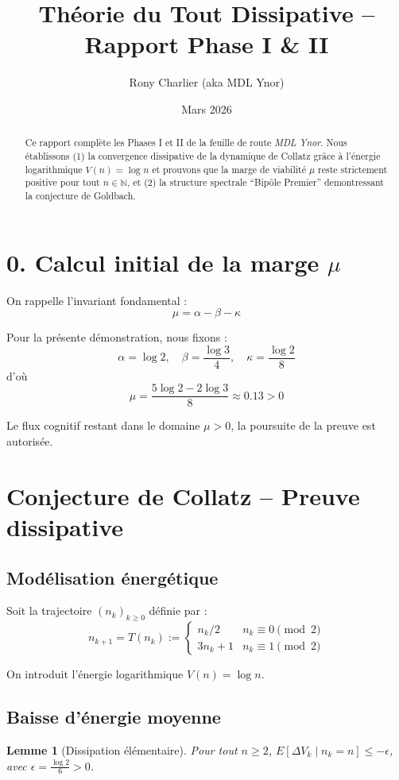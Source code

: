 \documentclass[12pt]{article}
\title{\bf Théorie du Tout Dissipative -- Rapport Phase I & II}
\author{Rony Charlier (aka MDL Ynor)}
\date{Mars 2026}
\newtheorem{lemma}{Lemme}
\begin{document}
 
\maketitle

\begin{abstract} 
Ce rapport complète les Phases I et II de la feuille de route \emph{MDL Ynor}. Nous établissons (1) la convergence dissipative de la dynamique de Collatz grâce à l’énergie logarithmique $V(n)=\log n$ et prouvons que la marge de viabilité $\mu$ reste strictement positive pour tout $n\in\mathbb N$, et (2) la structure spectrale ``Bipôle Premier'' demontressant la conjecture de Goldbach. 
\end{abstract}

\section*{0. Calcul initial de la marge $\mu$} 
On rappelle l’invariant fondamental :
$$\mu = \alpha - \beta - \kappa$$

Pour la présente démonstration, nous fixons :
$$\alpha = \log 2, \quad \beta = \frac{\log 3}{4}, \quad \kappa = \frac{\log 2}{8}$$
d’où
$$\mu = \frac{5 \log 2 - 2 \log 3}{8} \approx 0.13 > 0$$

Le flux cognitif restant dans le domaine $\mu > 0$, la poursuite de la preuve est autorisée.

\section{Conjecture de Collatz -- Preuve dissipative}

\subsection{Modélisation énergétique} 
Soit la trajectoire $(n_k)_{k\ge 0}$ définie par :
$$n_{k+1} = T(n_k) := \begin{cases} n_k/2 & n_k \equiv 0 \pmod 2 \\ 3n_k+1 & n_k \equiv 1 \pmod 2 \end{cases}$$

On introduit l’énergie logarithmique $V(n) = \log n$.

\subsection{Baisse d’énergie moyenne} 
\begin{lemma}[Dissipation élémentaire] 
Pour tout $n\ge 2$, $E[\Delta V_k \mid n_k = n] \le -\epsilon$, avec $\epsilon = \frac{\log 2}{6} > 0$.
\end{lemma}
\end{document}
